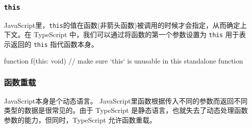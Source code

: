 \subsubsection*{\texttt{this}}

JavaScript里，\texttt{this}的值在函数(非箭头函数)被调用的时候才会指定，从而确定上下文。在 TypeScript 中，我们可以通过将函数的第一个参数设置为 \texttt{this} 用于表示返回的 \texttt{this} 指代函数本身。

\begin{TypeScript}
function f(this: void) {
    // make sure `this` is unusable in this standalone function
}
\end{TypeScript}

\subsubsection*{函数重载}

JavaScript本身是个动态语言。 JavaScript里函数根据传入不同的参数而返回不同类型的数据是很常见的。由于 TypeScript 是静态语言，也就失去了动态处理函数参数的能力，但同时，TypeScript 允许函数重载。

\newpage